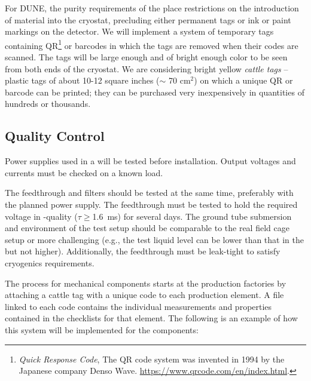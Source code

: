 For DUNE, the purity requirements of the \lar place restrictions on the introduction of material into the cryostat, precluding either permanent tags or ink or paint markings on the detector.  We will implement a system of temporary tags containing QR\footnote{\textit{Quick Response Code}, The QR code system was invented in 1994 by the Japanese company Denso Wave. \url{https://www.qrcode.com/en/index.html}.} %
or barcodes in which the tags are removed when their codes are scanned.  %
%
The tags will be large enough and of bright enough color to be seen from both ends of the cryostat.  We are considering %
bright yellow \textit{cattle tags} -- plastic tags of about 10-12 square inches ($\sim$ 70 cm$^{2}$) on which a unique QR\texttrademark{} or barcode can be printed; they can be purchased very inexpensively in quantities of hundreds or thousands.

\subsection{Quality Control}
\label{sec:fdsp-hv-transport-QC}

Power supplies used in a  will be tested before installation.  Output voltages and currents must be checked on a known load. 

The feedthrough and filters should be tested at the same time, preferably with the planned power supply.  The feedthrough must be tested to hold the required voltage in -quality  ($\tau\geq$\SI{1.6}{ms}) for several days.  The ground tube submersion and \efield{} environment of the test setup should be comparable to the real field cage setup or more challenging (e.g., the test liquid level can be lower than %
that in the  but not higher).  Additionally, the feedthrough must be leak-tight to satisfy cryogenics requirements.

The  process for mechanical components starts at the production factories by attaching a cattle tag with a unique code to each production element.  A file linked to each code contains the individual measurements and properties contained in the  checklists for that element.  The following is an example of how this system will be implemented for the  components:

